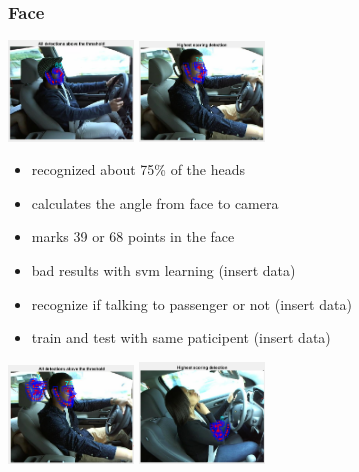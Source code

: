 \documentclass{beamer}
\begin{document}
	\begin{frame}
		\frametitle{Face}
		\includegraphics[width=0.25\textwidth]{faces/face1.PNG} \vspace{0.1cm}
		\includegraphics[width=0.25\textwidth]{faces/face2.PNG} \vspace{0.1cm}
		\begin{itemize}
			\item recognized about 75\% of the heads
			\item calculates the angle from face to camera
			\item marks 39 or 68 points in the face
			\item bad results with svm learning (insert data)
			\item recognize if talking to passenger or not (insert data)
			\item train and test with same paticipent (insert data)
		\end{itemize}
		\includegraphics[width=0.25\textwidth]{faces/face3} \hspace{0.1cm}
		\includegraphics[width=0.25\textwidth]{faces/face7}
	\end{frame}
	
\end{document}
